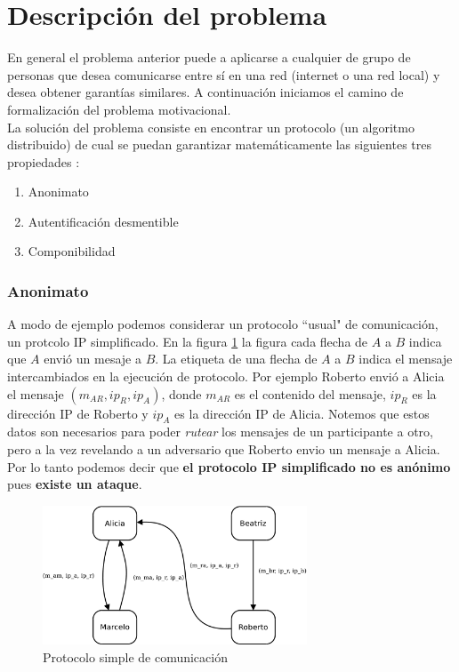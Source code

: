 \section{Descripción del problema}

En general el problema anterior puede a aplicarse a cualquier de grupo de personas que
desea comunicarse entre sí en una red (internet o una red local) y desea obtener garantías
similares. A continuación iniciamos el camino de formalización del problema motivacional.\\
La solución del problema consiste en encontrar un protocolo (un algoritmo distribuido) de cual
se puedan garantizar matemáticamente las siguientes tres propiedades :
\begin{enumerate}
    \item Anonimato
    \item Autentificación desmentible
    \item Componibilidad
\end{enumerate}

\subsubsection{Anonimato}
A modo de ejemplo podemos considerar un protocolo ``usual" de comunicación, un protcolo IP simplificado.
En la figura \ref{tcpip_simple} la figura cada flecha de $A$ a $B$ indica que $A$ envió un mesaje a
$B$. La etiqueta de una flecha de $A$ a $B$ indica el mensaje intercambiados en la ejecución de protocolo.
Por ejemplo Roberto envió a Alicia el mensaje $(m_{AR}, ip_R, ip_A)$, donde $m_{AR}$ es el contenido
del mensaje, $ip_R$ es la dirección IP de Roberto y $ip_A$ es la dirección IP de Alicia. Notemos que estos
datos son necesarios para poder \textit{rutear} los mensajes de un participante a otro, pero a la vez 
revelando a un adversario que Roberto envio un mensaje a Alicia. Por lo tanto podemos decir que
\textbf{el protocolo IP simplificado no es anónimo} pues \textbf{existe un ataque}.\\

\begin{figure}[hp]
    \centering
    \includegraphics[width=0.7\textwidth]{figs/tcpip_simple}
    \caption{Protocolo simple de comunicación}
    \label{tcpip_simple}
\end{figure}

